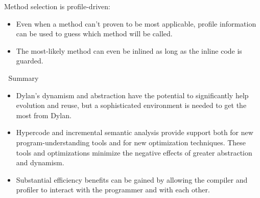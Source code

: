 Method selection is profile-driven:
\begin{itemize}

\item Even when a method can't proven to be most applicable, profile
information can be used to guess which method will be called.

\item The most-likely method can even be inlined as long as the inline code is
guarded.
\end{itemize}


\newpage
Summary

\begin{itemize}
\item Dylan's dynamism and abstraction have the potential to significantly help
evolution and reuse, but a sophisticated environment is needed to get the most
from Dylan.

\item Hypercode and incremental semantic analysis provide support both for new
program-understanding tools and for new optimization techniques.  These tools
and optimizations minimize the negative effects of greater abstraction and
dynamism.

\item Substantial efficiency benefits can be gained by allowing the compiler
and profiler to interact with the programmer and with each other.
\end{itemize}


